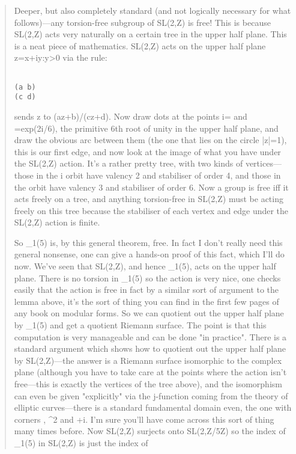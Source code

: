 \begin{quote}
 Deeper, but also completely standard (and not logically necessary
 for what follows)---any torsion-free subgroup
 of SL(2,Z) is free! This is because SL(2,Z) acts very naturally
 on a certain tree in the upper half plane. This is a neat piece
 of mathematics. SL(2,Z) acts on the upper half plane {z=x+iy:y>0}
 via the rule:

\begin{verbatim}

(a b)
(c d)
\end{verbatim}
    
 sends z to (az+b)/(cz+d). Now draw dots
 at the points i= and \rho =exp(2\pi i/6), the primitive 6th
 root of unity in the upper half plane, and draw the obvious arc
 between them (the one that lies on the circle |z|=1), this is
 our first edge, and now look at the image of what you have
 under the SL(2,Z) action. It's a rather pretty tree, with two kinds
 of vertices---those in the i orbit have valency 2 and stabiliser
 of order 4, and those in the \rho  orbit have valency 3 and stabiliser
 of order 6. Now a group is free iff it acts freely on a tree, 
 and anything torsion-free in SL(2,Z) must be acting freely
 on this tree because the stabiliser of each vertex and edge under
 the SL(2,Z) action is finite.

 So \Gamma _{1}(5) is, by this general theorem, free. In fact I don't
 really need this general nonsense, one can give a hands-on proof
 of this fact, which I'll do now. We've seen that SL(2,Z), and hence
 \Gamma _{1}(5), acts on the upper half plane. There is no torsion
 in \Gamma _{1}(5) so the action is very nice, one checks easily that
 the action is free in fact by a similar sort of argument to the lemma
 above, it's the sort of thing you can find in the first few pages
 of any book on modular forms. So we can quotient out the upper half
 plane by \Gamma _{1}(5) and get a quotient Riemann surface. The point
 is that this computation is very manageable and can be done "in practice".
 There is a standard argument which shows how to quotient out the
 upper half plane by SL(2,Z)---the answer is a Riemann surface
 isomorphic to the complex plane (although you have to take care
 at the points where the action isn't free---this is exactly the vertices
 of the tree above), and the isomorphism can even
 be given "explicitly" via the j-function coming from the theory
 of elliptic curves---there is a standard fundamental domain even,
 the one with corners \rho , \rho ^{2} and +i\infty . 
I'm sure you'll have
 come across this sort of thing many times before. Now SL(2,Z)
 surjects onto SL(2,Z/5Z) so the index of \Gamma _{1}(5) in SL(2,Z)
 is just the index of 


\end{quote}
